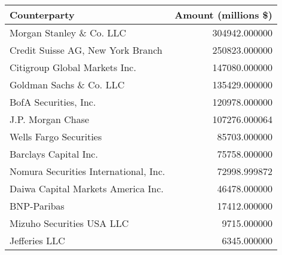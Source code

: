 \begin{tabular}{lr}
\toprule
                         Counterparty &  Amount (millions \$) \\
\midrule
             Morgan Stanley \& Co. LLC &        304942.000000 \\
    Credit Suisse AG, New York Branch &        250823.000000 \\
        Citigroup Global Markets Inc. &        147080.000000 \\
              Goldman Sachs \& Co. LLC &        135429.000000 \\
                BofA Securities, Inc. &        120978.000000 \\
                    J.P. Morgan Chase &        107276.000064 \\
               Wells Fargo Securities &         85703.000000 \\
                Barclays Capital Inc. &         75758.000000 \\
Nomura Securities International, Inc. &         72998.999872 \\
   Daiwa Capital Markets America Inc. &         46478.000000 \\
                          BNP-Paribas &         17412.000000 \\
            Mizuho Securities USA LLC &          9715.000000 \\
                        Jefferies LLC &          6345.000000 \\
\bottomrule
\end{tabular}
